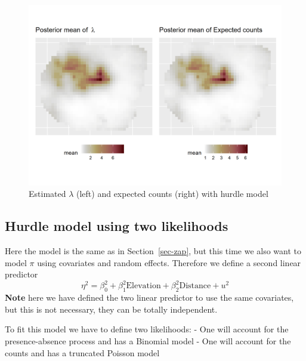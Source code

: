 \documentclass[
  letterpaper,
  DIV=11,
  numbers=noendperiod]{scrartcl}
\begin{document}
\begin{figure}[H]

{\centering \includegraphics[width=0.8\linewidth,height=\textheight,keepaspectratio]{day5_practical_8_files/figure-pdf/unnamed-chunk-76-1.png}

}

\caption{Estimated \(\lambda\) (left) and expected counts (right) with
hurdle model}

\end{figure}%

\subsection{Hurdle model using two likelihoods}\label{sec-two-lik}

Here the model is the same as in Section~\ref{sec-zap}, but this time we
also want to model \(\pi\) using covariates and random effects.
Therefore we define a second linear predictor \[
\eta^2 =\beta_0^2 + \beta_1^2\text{Elevation} +  \beta_2^2\text{Distance} + u^2 
\] \textbf{Note} here we have defined the two linear predictor to use
the same covariates, but this is not necessary, they can be totally
independent.

To fit this model we have to define two likelihoods: - One will account
for the presence-absence process and has a Binomial model - One will
account for the counts and has a truncated Poisson model
\end{document}

